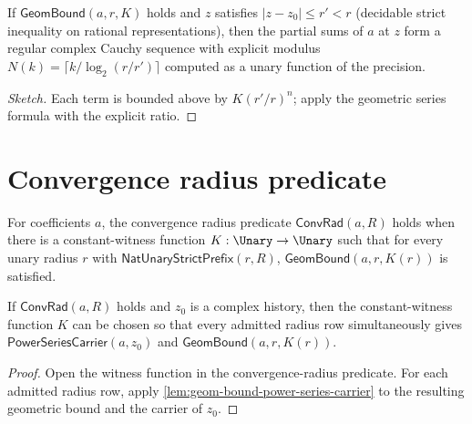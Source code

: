 \begin{lemma}
\label{lem:geom-bound-majorant}
If \(\mathsf{GeomBound}(a, r, K)\) holds and \(z\) satisfies \(|z - z_0| \leq r' < r\) (decidable strict inequality on rational representations), then the partial sums of \(a\) at \(z\) form a regular complex Cauchy sequence with explicit modulus \(N(k) = \lceil k / \log_2(r/r') \rceil\) computed as a unary function of the precision.
\end{lemma}
\begin{proof}[Sketch]
Each term is bounded above by \(K (r'/r)^n\); apply the geometric series formula with the explicit ratio.
\end{proof}

\section{Convergence radius predicate}

\begin{definition}
\label{def:conv-rad}
For coefficients \(a\), the convergence radius predicate \(\mathsf{ConvRad}(a, R)\) holds when there is a constant-witness function \(K : \Unary \to \Unary\) such that for every unary radius \(r\) with \(\mathsf{NatUnaryStrictPrefix}(r, R)\), \(\mathsf{GeomBound}(a, r, K(r))\) is satisfied.
\end{definition}

\begin{lemma}
\label{lem:conv-rad-power-series-carrier-witness}
If \(\mathsf{ConvRad}(a,R)\) holds and \(z_0\) is a complex history, then the
constant-witness function \(K\) can be chosen so that every admitted radius row
simultaneously gives \(\mathsf{PowerSeriesCarrier}(a,z_0)\) and
\(\mathsf{GeomBound}(a,r,K(r))\).
\end{lemma}
\begin{proof}
Open the witness function in the convergence-radius predicate. For each
admitted radius row, apply
\autoref{lem:geom-bound-power-series-carrier} to the resulting geometric
bound and the carrier of \(z_0\).
\end{proof}

